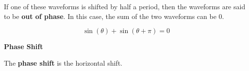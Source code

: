 \documentclass{ximera}
\begin{document}
If one of these waveforms is shifted by half a period, then the waveforms are said to be \textbf{out of phase}. In this case, the sum of the two waveforms can be $0$.



\[
\sin(\theta) + \sin(\theta + \pi) = 0
\]




\begin{center}
\end{center}









\begin{definition} \textbf{\textcolor{green!50!black}{Phase Shift}}

The \textbf{phase shift} is the horizontal shift.

\end{definition}
\end{document}
